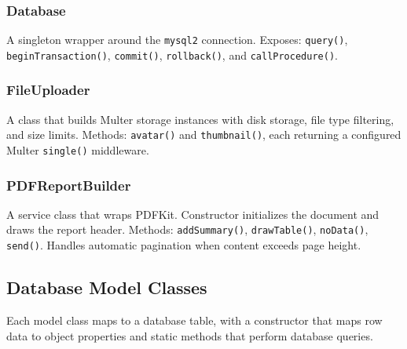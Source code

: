 \documentclass[a4paper, twoside]{article}
\begin{document}
\subsubsection{Database}
A singleton wrapper around the \texttt{mysql2} connection. Exposes: \texttt{query()}, \texttt{beginTransaction()}, \texttt{commit()}, \texttt{rollback()}, and \texttt{callProcedure()}.

\subsubsection{FileUploader}
A class that builds Multer storage instances with disk storage, file type filtering, and size limits. Methods: \texttt{avatar()} and \texttt{thumbnail()}, each returning a configured Multer \texttt{single()} middleware.

\subsubsection{PDFReportBuilder}
A service class that wraps PDFKit. Constructor initializes the document and draws the report header. Methods: \texttt{addSummary()}, \texttt{drawTable()}, \texttt{noData()}, \texttt{send()}. Handles automatic pagination when content exceeds page height.

\subsection{Database Model Classes}

Each model class maps to a database table, with a constructor that maps row data to object properties and static methods that perform database queries.
\end{document}
